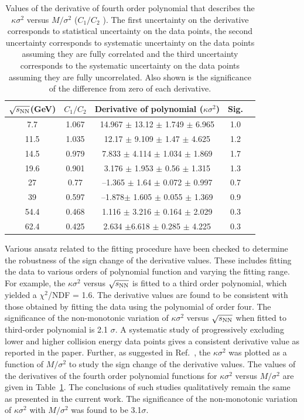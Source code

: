 \documentclass[10pt,aps,prc,twocolumn,floatfix]{revtex4-1}
\newcommand{\rootsnn} {\mbox{$\sqrt{s_{\rm NN}}$}\xspace}
\begin{document}
{\begin{table}
	\caption{Values of the derivative of fourth order polynomial
		that describes the $\kappa\sigma^{2}$ versus $M/\sigma^{2}$ ($C_{1}/C_{2}$ ). The first uncertainty on the
		derivative corresponds to statistical uncertainty
		on the data points, the second uncertainty corresponds to systematic
		uncertainty on the data points assuming they are fully correlated and
		the third uncertainty corresponds to the systematic uncertainty on the
		data points assuming they are fully uncorrelated. Also shown is the significance of the difference from zero of each derivative.}
	\centering   
	\begin{tabular}{|c|c|c|c|c|}
		\hline	
		\rootsnn (GeV) & $C_{1}/C_{2}$& Derivative of polynomial ($\kappa\sigma^{2}$)&Sig.  \\
		\hline 
7.7 & 1.067&14.967 $\pm$ 13.12 $\pm$ 1.749 $\pm$ 6.965  &1.0 \\
\hline 
11.5 & 1.035$  $&12.17 $\pm$ 9.109 $\pm$ 1.47 $\pm$ 4.625 &1.2 \\
\hline 
14.5 & 0.979&7.833 $\pm$ 4.114 $\pm$ 1.034 $\pm$ 1.869 &1.7 \\
\hline 
19.6 & 0.901&3.176 $\pm$ 1.953 $\pm$ 0.56 $\pm$ 1.315 & 1.3\\
\hline 
27 & 0.77&--1.365 $\pm$ 1.64 $\pm$ 0.072 $\pm$ 0.997 & 0.7\\
\hline 
39 & 0.597&--1.878$\pm$ 1.605 $\pm$ 0.055 $\pm$ 1.369 & 0.9\\
\hline 
54.4 &0.468& 1.116 $\pm$ 3.216 $\pm$ 0.164 $\pm$ 2.029 & 0.3 \\
\hline 
62.4 &0.425& 2.634 $\pm$6.618 $\pm$ 0.285  $\pm$ 4.225 &0.3 \\
\hline 
	\end{tabular}
	\label{tab3}
\end{table}
Various ansatz related to the fitting procedure have been checked to determine the robustness of the sign change of the derivative
values. These includes fitting the data to various orders of
polynomial function and varying the fitting range.
For example, the $\kappa\sigma^{2}$  versus \rootsnn is 
fitted to a third order polynomial, which yielded a
$\chi^{2}$/NDF = 1.6. The derivative values are found to be consistent
with those obtained by fitting the data using the polynomial of order
four. The significance of the non-monotonic variation of
$\kappa\sigma^{2}$  versus \rootsnn when fitted to third-order
polynomial is 2.1 $\sigma$. A systematic study of progressively
excluding lower and higher collision energy data points gives a
consistent derivative value as reported in the paper.
Further, as
suggested in Ref.~\cite{Bazavov:2017tot}, the $\kappa\sigma^{2}$ was plotted as a function of $M/\sigma^{2}$ to study
the sign change of the derivative values. The values of the
derivatives of the fourth order polynomial functions for $\kappa\sigma^{2}$
versus $M/\sigma^{2}$ are given in Table~\ref{tab3}. The conclusions of such
studies qualitatively remain the same as presented in the current
work. The significance of the non-monotonic variation of
$\kappa\sigma^{2}$ with $M/\sigma^{2}$ was found to be 3.1$\sigma$.



}
\end{document}
